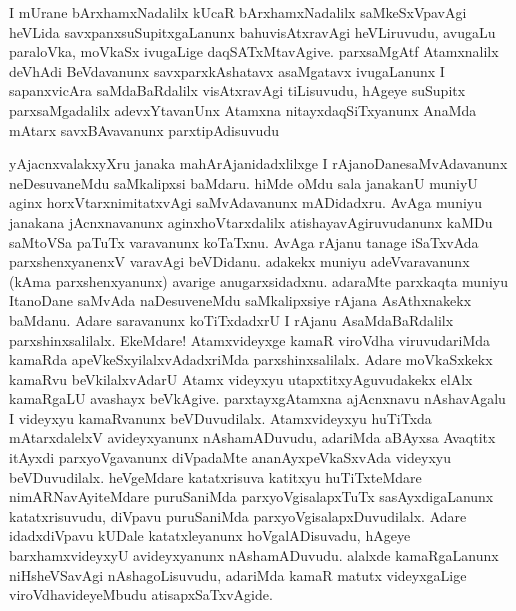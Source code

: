 


\begin{artha}
I mUrane bArxhamxNadalilx kUcaR bArxhamxNadalilx saMkeSxVpavAgi heVLida savxpanxsuSupitxgaLanunx bahuvisAtxravAgi heVLiruvudu, avugaLu paraloVka, moVkaSx ivugaLige daqSATxMtavAgive. parxsaMgAtf Atamxnalilx deVhAdi BeVdavanunx savxparxkAshatavx asaMgatavx ivugaLanunx I sapanxvicAra saMdaBaRdalilx visAtxravAgi tiLisuvudu, hAgeye suSupitx parxsaMgadalilx adevxYtavanUnx Atamxna nitayxdaqSiTxyanunx AnaMda mAtarx savxBAvavanunx parxtipAdisuvudu
\end{artha}


\begin{artha}
yAjacnxvalakxyXru janaka mahArAjanidadxlilxge I rAjanoDane\break saMvAdavanunx neDesuvaneMdu saMkalipxsi baMdaru. hiMde oMdu sala janakanU muniyU aginx horxVtarxnimitatxvAgi saMvAdavanunx mADidadxru. AvAga muniyu janakana jAcnxnavanunx aginxhoVtarxdalilx atishayavAgiruvudanunx kaMDu saMtoVSa paTuTx varavanunx koTaTxnu. AvAga rAjanu tanage iSaTxvAda parxshenxyanenxV varavAgi beVDidanu. adakekx muniyu adeVvaravanunx (kAma parxshenxyanunx) avarige anugarxsidadxnu. adaraMte parxkaqta muniyu ItanoDane saMvAda naDesuveneMdu saMkalipxsiye rAjana AsAthxnakekx baMdanu. Adare saravanunx koTiTxdadxrU I rAjanu AsaMdaBaRdalilx parxshinxsalilalx. EkeMdare! Atamxvideyxge kamaR viroVdha viruvudariMda kamaRda apeVkeSxyilalxvAdadxriMda parxshinxsalilalx. Adare moVkaSxkekx kamaRvu beVkilalxvAdarU Atamx videyxyu utapxtitxyAguvudakekx elAlx kamaRgaLU avashayx beVkAgive. parxtayxgAtamxna ajAcnxnavu nAshavAgalu I videyxyu kamaRvanunx beVDuvudilalx. Atamxvideyxyu huTiTxda mAtarxdalelxV avideyxyanunx nAshamADuvudu, adariMda aBAyxsa Avaqtitx itAyxdi parxyoVgavanunx diVpadaMte ananAyxpeVkaSxvAda videyxyu beVDuvudilalx. heVgeMdare katatxrisuva katitxyu huTiTxteMdare nimARNavAyiteMdare puruSaniMda parxyoVgisalapxTuTx sasAyxdigaLanunx katatxrisuvudu, diVpavu puruSaniMda parxyoVgisalapxDuvudilalx. Adare idadxdiVpavu kUDale katatxleyanunx hoVgalADisuvadu, hAgeye barxhamxvideyxyU avideyxyanunx nAshamADuvudu. alalxde kamaRgaLanunx niHsheVSavAgi nAshagoLisuvudu, adariMda kamaR matutx videyxgaLige viroVdhavideyeMbudu atisapxSaTxvAgide. 
\end{artha}%

